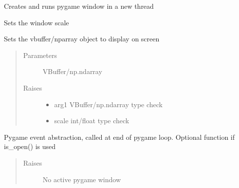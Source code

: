 \documentclass[letterpaper,10pt,english,openany,oneside]{sphinxmanual}
\begin{document}
\begin{fulllineitems}
\begin{fulllineitems}
\sphinxAtStartPar
Creates and runs pygame window in a new thread

\end{fulllineitems}



\begin{fulllineitems}
\sphinxAtStartPar
Sets the window scale

\end{fulllineitems}



\begin{fulllineitems}
\sphinxAtStartPar
Sets the vbuffer/nparray object to display on screen
\begin{quote}\begin{description}
\item[{Parameters}] \leavevmode
\sphinxAtStartPar
{} \textendash{} VBuffer/np.ndarray

\item[{Raises}] \leavevmode\begin{itemize}
\item {} 
\sphinxAtStartPar
{} \textendash{} arg1 VBuffer/np.ndarray type check

\item {} 
\sphinxAtStartPar
{} \textendash{} scale int/float type check

\end{itemize}

\end{description}\end{quote}

\end{fulllineitems}



\begin{fulllineitems}
\sphinxAtStartPar
Pygame event abstraction, called at end of pygame loop.
Optional function if is\_open() is used
\begin{quote}\begin{description}
\item[{Raises}] \leavevmode
\sphinxAtStartPar
{} \textendash{} No active pygame window

\end{description}\end{quote}

\end{fulllineitems}


\end{fulllineitems}
\end{document}
